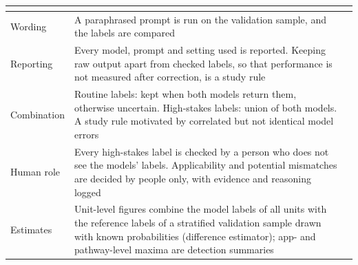 \begin{table}[H]
\begin{singlespace}
\begin{tabularx}{\textwidth}{@{}>{\raggedright\arraybackslash}p{2.1cm}>{\raggedright\arraybackslash}X>{\raggedright\arraybackslash}p{3.6cm}@{}}
  & \parencite[\S4.3, pp.~3888--3889]{rodriguez2024llm} \\
\cmidrule[0.3pt]{2-3}
Wording & A paraphrased prompt is run on the validation sample, and the labels are compared
  & \parencite{tornberg2024best}\parencite{baumann2025llm} \\
\cmidrule[0.3pt]{2-3}
Reporting & Every model, prompt and setting used is reported. Keeping raw output apart from checked labels, so that performance is not measured after correction, is a study rule
  & \parencite[p.~18]{baumann2025llm} \\
\cmidrule[0.3pt]{2-3}
Combination & Routine labels: kept when both models return them, otherwise uncertain. High-stakes labels: union of both models. A study rule motivated by correlated but not identical model errors
  & \parencite{kim2025correlated} \\
\cmidrule[0.3pt]{2-3}
Human role & Every high-stakes label is checked by a person who does not see the models' labels. Applicability and potential mismatches are decided by people only, with evidence and reasoning logged
  & \parencite{schroeder2025just}\parencite{pangakis2023automated} \\
\cmidrule[0.3pt]{2-3}
Estimates & Unit-level figures combine the model labels of all units with the reference labels of a stratified validation sample drawn with known probabilities (difference estimator); app- and pathway-level maxima are detection summaries
  & \parencite[\S4]{egami2023using}\parencite{angelopoulos2023prediction,fisch2024stratified} \\
\bottomrule
\end{tabularx}
\end{singlespace}
\end{table}

